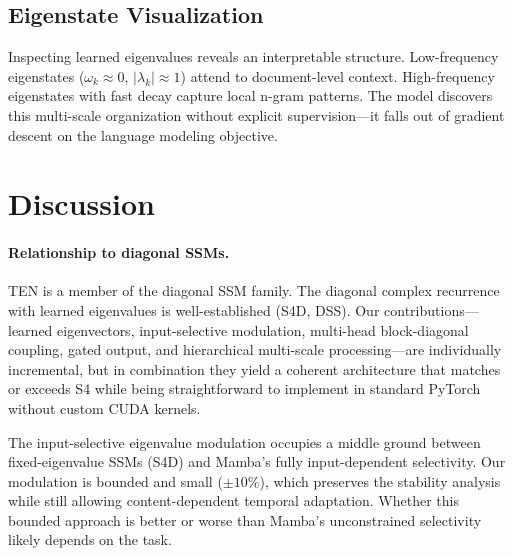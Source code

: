 \documentclass{article}
\begin{document}
\subsection{Eigenstate Visualization}

Inspecting learned eigenvalues reveals an interpretable structure. Low-frequency eigenstates ($\omega_k \approx 0$, $|\lambda_k| \approx 1$) attend to document-level context. High-frequency eigenstates with fast decay capture local n-gram patterns. The model discovers this multi-scale organization without explicit supervision---it falls out of gradient descent on the language modeling objective.


\section{Discussion}

\paragraph{Relationship to diagonal SSMs.}
TEN is a member of the diagonal SSM family. The diagonal complex recurrence with learned eigenvalues is well-established (S4D, DSS). Our contributions---learned eigenvectors, input-selective modulation, multi-head block-diagonal coupling, gated output, and hierarchical multi-scale processing---are individually incremental, but in combination they yield a coherent architecture that matches or exceeds S4 while being straightforward to implement in standard PyTorch without custom CUDA kernels.

The input-selective eigenvalue modulation occupies a middle ground between fixed-eigenvalue SSMs (S4D) and Mamba's fully input-dependent selectivity. Our modulation is bounded and small ($\pm 10\%$), which preserves the stability analysis while still allowing content-dependent temporal adaptation. Whether this bounded approach is better or worse than Mamba's unconstrained selectivity likely depends on the task.
\end{document}
